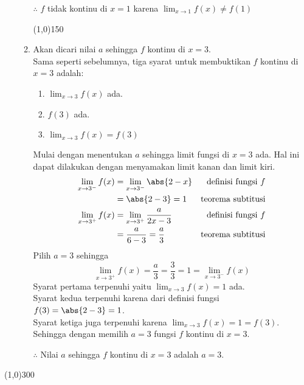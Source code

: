 \begin{enumerate}[leftmargin=*, label={\arabic*}.]
\begin{enumerate}[label={\alph*}.]
$\therefore$ $f$ tidak kontinu di $x=1$ karena $\lim_{x\to 1} f(x) \neq f(1)$
\begin{center}
    \line(1,0){150}
\end{center}
\item Akan dicari nilai $a$ sehingga $f$ kontinu di $x=3$.\\
Sama seperti sebelumnya, tiga syarat untuk membuktikan $f$ kontinu di
$x=3$ adalah:
\begin{enumerate}[label={\arabic*}.]
    \item $\lim_{x\to 3} f(x)$ ada.
    \item $f(3)$ ada.
    \item $\lim_{x\to 3} f(x) = f(3)$
\end{enumerate}
Mulai dengan menentukan $a$ sehingga limit fungsi di $x=3$ ada. Hal ini 
dapat dilakukan dengan menyamakan limit kanan dan limit kiri.
\begin{align*}
    \lim_{x\to 3^{-}} f(x) 
    &= \lim_{x\to 3^{-}} \abs{2-x}
    &\text{definisi fungsi $f$}\\
    &= \abs{2-3} = 1
    &\text{teorema subtitusi}\\
    \lim_{x\to 3^{+}} f(x) 
    &= \lim_{x\to 3^{+}} \frac{a}{2x-3}
    &\text{definisi fungsi $f$}\\
    &= \frac{a}{6-3} = \frac{a}{3}
    &\text{teorema subtitusi}
\end{align*}
Pilih $a = 3$ sehingga
\[
    \lim_{x\to 3^{+}} f(x) = \frac{a}{3} = \frac{3}{3} = 1 = \lim_{x\to 3^{-}} f(x) 
\]
Syarat pertama terpenuhi yaitu $\lim_{x\to 3} f(x) = 1$ ada.\\
Syarat kedua terpenuhi karena dari definisi fungsi $f(3) = \abs{2-3} = 1$.\\
Syarat ketiga juga terpenuhi karena $\lim_{x\to 3} f(x) = 1 = f(3)$.
Sehingga dengan memilih $a=3$ fungsi $f$ kontinu di $x=3$.

$\therefore$ Nilai $a$ sehingga $f$ kontinu di $x=3$ adalah $a=3$.
\end{enumerate}
\end{enumerate}
\begin{center}
    \line(1,0){300}
\end{center}